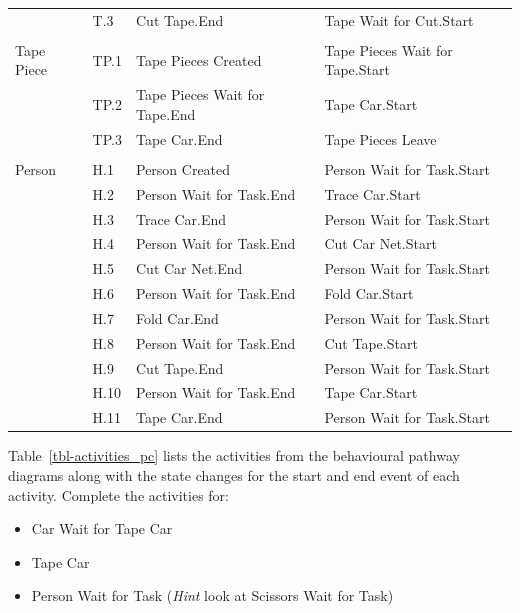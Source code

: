 \documentclass[
  10pt,
  a4paperpaper,
  DIV=11,
  numbers=noendperiod,
  oneside]{scrreprt}
\providecommand{\tightlist}{%
  \setlength{\itemsep}{0pt}\setlength{\parskip}{0pt}}\usepackage{longtable,booktabs,array}
\begin{document}
\begin{longtable}{p{2.4cm}>{\raggedright\arraybackslash}p{1.2cm}>{\raggedright\arraybackslash}p{5.9cm}>{\raggedright\arraybackslash}p{5.9cm}}
       & T.3 & Cut Tape.End & Tape Wait for Cut.Start \\
       &      &              &              \\
Tape Piece & TP.1 & Tape Pieces Created & Tape Pieces Wait for Tape.Start \\
           & TP.2 & Tape Pieces Wait for Tape.End & Tape Car.Start \\
           & TP.3 & Tape Car.End & Tape Pieces Leave \\
     &      &              &              \\
Person & H.1 & Person Created & Person Wait for Task.Start \\
       & H.2 & Person Wait for Task.End & Trace Car.Start \\
       & H.3 & Trace Car.End & Person Wait for Task.Start \\
       & H.4 & Person Wait for Task.End & Cut Car Net.Start \\
       & H.5 & Cut Car Net.End & Person Wait for Task.Start \\
       & H.6 & Person Wait for Task.End & Fold Car.Start \\
       & H.7 & Fold Car.End & Person Wait for Task.Start \\
       & H.8 & Person Wait for Task.End & Cut Tape.Start \\
       & H.9 & Cut Tape.End & Person Wait for Task.Start \\
       & H.10 & Person Wait for Task.End & Tape Car.Start \\
       & H.11 & Tape Car.End & Person Wait for Task.Start \\\bottomrule

\end{longtable}

Table~\ref{tbl-activities_pc} lists the activities from the behavioural
pathway diagrams along with the state changes for the start and end
event of each activity. Complete the activities for:

\begin{itemize}
\tightlist
\item
  Car Wait for Tape Car
\item
  Tape Car
\item
  Person Wait for Task (\emph{Hint} look at Scissors Wait for Task)
\end{itemize}
\end{document}
